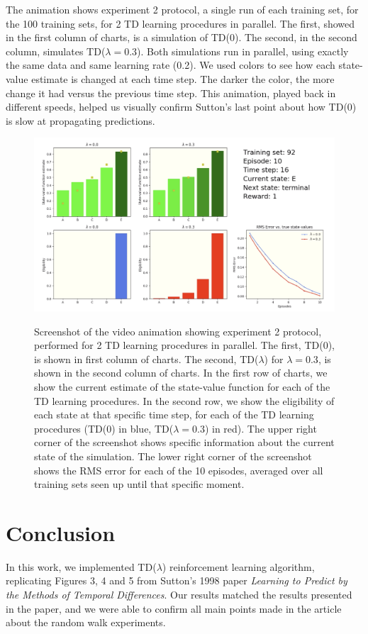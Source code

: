 \documentclass{article}
\begin{document}
The animation shows experiment 2 protocol, a single run of each training set, for the 100 training sets, for 2 TD learning procedures in parallel.
The first, showed in the first column of charts, is a simulation of TD(0).
The second, in the second column, simulates TD($\lambda = 0.3$).
Both simulations run in parallel, using exactly the same data and same learning rate (0.2).
We used colors to see how each state-value estimate is changed at each time step.
The darker the color, the more change it had versus the previous time step.
This animation, played back in different speeds, helped us visually confirm Sutton's last point about how TD(0) is slow at propagating predictions.
\begin{figure}[t]
    \includegraphics[width=\textwidth]{./images/screenshot.png}
    \centering
    \label{fig:fig3}
    \caption{Screenshot of the video animation showing experiment 2 protocol, performed for 2 TD learning procedures in parallel.
    The first, TD(0), is shown in first column of charts.
    The second, TD($\lambda$) for $\lambda = 0.3$, is shown in the second column of charts.
    In the first row of charts, we show the current estimate of the state-value function for each of the TD learning procedures.
    In the second row, we show the eligibility of each state at that specific time step, for each of the TD learning procedures (TD(0) in blue, TD($\lambda = 0.3$) in red).
    The upper right corner of the screenshot shows specific information about the current state of the simulation.
    The lower right corner of the screenshot shows the RMS error for each of the 10 episodes, averaged over all training sets seen up until that specific moment.}
\end{figure}

\section{Conclusion}
\label{sec:conclusion}
In this work, we implemented TD($\lambda$) reinforcement learning algorithm, replicating Figures 3, 4 and 5 from Sutton's 1998 paper \emph{Learning to Predict by the Methods of Temporal Differences}.
Our results matched the results presented in the paper, and we were able to confirm all main points made in the article about the random walk experiments.



\end{document}

